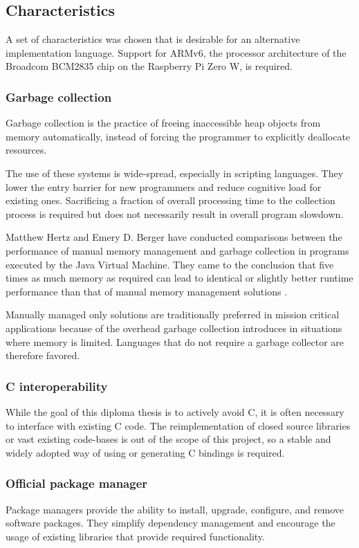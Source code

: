 \subsection{Characteristics}
A set of characteristics was chosen that is desirable for an alternative implementation language. Support for ARMv6, the processor architecture of the Broadcom BCM2835 chip on the Raspberry Pi Zero W, is required.

\subsubsection{Garbage collection}
Garbage collection is the practice of freeing inaccessible heap objects from memory automatically, instead of forcing the programmer to explicitly deallocate resources.

The use of these systems is wide-spread, especially in scripting languages. They lower the entry barrier for new programmers and reduce cognitive load for existing ones. Sacrificing a fraction of overall processing time to the collection process is required but does not necessarily result in overall program slowdown. 

Matthew Hertz and Emery D. Berger have conducted comparisons between the performance of manual memory management and garbage collection in programs executed by the Java Virtual Machine. They came to the conclusion that five times as much memory as required can lead to identical or slightly better runtime performance than that of manual memory management solutions \cite{garbage-collection-vs-manual}. 

Manually managed only solutions are traditionally preferred in mission critical applications because of the overhead garbage collection introduces in situations where memory is limited. Languages that do not require a garbage collector are therefore favored.

\subsubsection{C interoperability}
While the goal of this diploma thesis is to actively avoid C, it is often necessary to interface with existing C code. The reimplementation of closed source libraries or vast existing code-bases is out of the scope of this project, so a stable and widely adopted way of using or generating C bindings is required.

\subsubsection{Official package manager}
Package managers provide the ability to install, upgrade, configure, and remove software packages. They simplify dependency management and encourage the usage of existing libraries that provide required functionality. 

